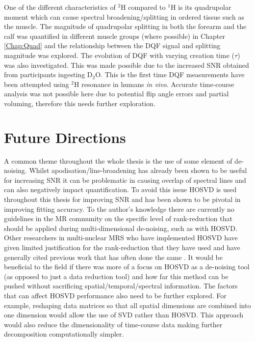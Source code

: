 One of the different characteristics of $^2$H compared to $^1$H is its quadrupolar moment which can cause spectral broadening/splitting in ordered tissue such as the muscle. The magnitude of quadrupolar splitting in both the forearm and the calf was quantified in different muscle groups (where possible) in Chapter \ref{Chap:Quad} and the relationship between the \ac{DQF} signal and splitting magnitude was explored. The evolution of \ac{DQF} with varying creation time ($\tau$) was also investigated. This was made possible due to the increased \ac{SNR} obtained from participants ingesting D$_2$O. This is the first time \ac{DQF} measurements have been attempted using $^2$H resonance in humans \textit{in vivo}. Accurate time-course analysis was not possible here due to potential flip angle errors and partial voluming, therefore this needs further exploration.

\section{Future Directions}

A common theme throughout the whole thesis is the use of some element of de-noising. Whilst apodisation/line-broadening has already been shown to be useful for increasing \ac{SNR} it can be problematic in causing overlap of spectral lines and can also negatively impact quantification. To avoid this issue \ac{HOSVD} is used throughout this thesis for improving \ac{SNR} and has been shown to be pivotal in improving fitting accuracy. To the author's knowledge there are currently no guidelines in the MR community on the specific level of rank-reduction that should be applied during multi-dimensional de-noising, such as with \ac{HOSVD}. Other researchers in multi-nuclear \ac{MRS} who have implemented \ac{HOSVD} have given limited justification for the rank-reduction that they have used and have generally cited previous work that has often done the same \cite{Kreis2020MeasuringMRI, vonMorze2021ComparisonT, Brender2019DynamicHyperpolarization}. It would be beneficial to the field if there was more of a focus on \ac{HOSVD} as a de-noising tool (as opposed to just a data reduction tool) and how far this method can be pushed without sacrificing spatial/temporal/spectral information. The factors that can affect \ac{HOSVD} performance also need to be further explored. For example, reshaping data matrices so that all spatial dimensions are combined into one dimension would allow the use of \ac{SVD} rather than \ac{HOSVD}. This approach would also reduce the dimensionality of time-course data making further decomposition computationally simpler.

